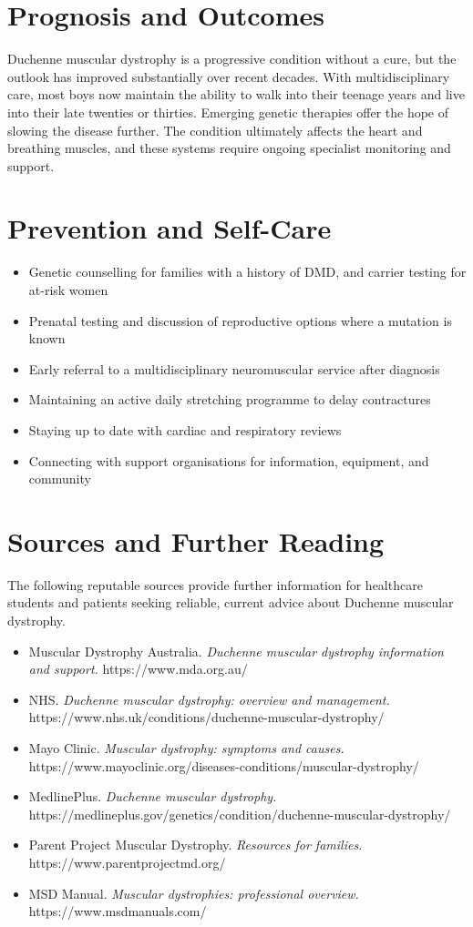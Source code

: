 \section*{Prognosis and Outcomes}
Duchenne muscular dystrophy is a progressive condition without a cure, but the outlook has improved substantially over recent decades. With multidisciplinary care, most boys now maintain the ability to walk into their teenage years and live into their late twenties or thirties. Emerging genetic therapies offer the hope of slowing the disease further. The condition ultimately affects the heart and breathing muscles, and these systems require ongoing specialist monitoring and support.

\section*{Prevention and Self-Care}
\begin{itemize}
    \item Genetic counselling for families with a history of DMD, and carrier testing for at-risk women
    \item Prenatal testing and discussion of reproductive options where a mutation is known
    \item Early referral to a multidisciplinary neuromuscular service after diagnosis
    \item Maintaining an active daily stretching programme to delay contractures
    \item Staying up to date with cardiac and respiratory reviews
    \item Connecting with support organisations for information, equipment, and community
\end{itemize}

\section*{Sources and Further Reading}
The following reputable sources provide further information for healthcare students and patients seeking reliable, current advice about Duchenne muscular dystrophy.
\begin{itemize}
    \item Muscular Dystrophy Australia. \textit{Duchenne muscular dystrophy information and support.} https://www.mda.org.au/
    \item NHS. \textit{Duchenne muscular dystrophy: overview and management.} https://www.nhs.uk/conditions/duchenne-muscular-dystrophy/
    \item Mayo Clinic. \textit{Muscular dystrophy: symptoms and causes.} https://www.mayoclinic.org/diseases-conditions/muscular-dystrophy/
    \item MedlinePlus. \textit{Duchenne muscular dystrophy.} https://medlineplus.gov/genetics/condition/duchenne-muscular-dystrophy/
    \item Parent Project Muscular Dystrophy. \textit{Resources for families.} https://www.parentprojectmd.org/
    \item MSD Manual. \textit{Muscular dystrophies: professional overview.} https://www.msdmanuals.com/
\end{itemize}
